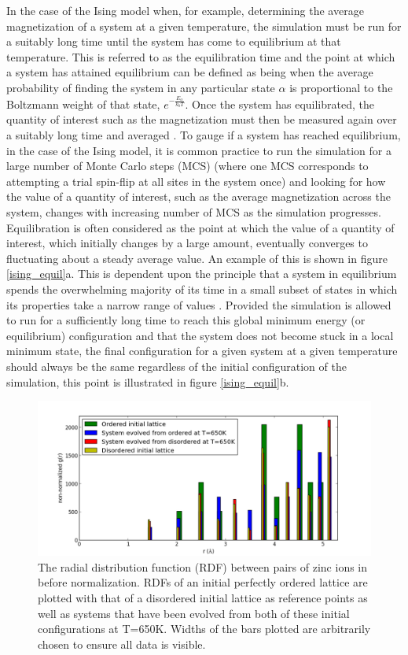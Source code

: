In the case of the Ising model when, for example, determining the average magnetization of a system at a given temperature, the simulation must be run for a suitably long time until the system has come to equilibrium at that temperature. This is referred to as the equilibration time and the point at which a system has attained equilibrium can be defined as being when the average probability of finding the system in any particular state $\alpha$ is proportional to the Boltzmann weight of that state, $e^{-\frac{E_\alpha}{k_bT}}$. Once the system has equilibrated, the quantity of interest such as the magnetization must then be measured again over a suitably long time and averaged \cite{MC}. 
To gauge if a system has reached equilibrium, in the case of the Ising model, it is common practice to run the simulation for a large number of Monte Carlo steps (MCS) (where one MCS corresponds to attempting a trial spin-flip at all sites in the system once) and looking for how the value of a quantity of interest, such as the average magnetization across the system, changes with increasing number of MCS as the simulation progresses. Equilibration is often considered as the point at which the value of a quantity of interest, which initially changes by a large amount, eventually converges to fluctuating about a steady average value. An example of this is shown in figure \ref{ising_equil}a. This is dependent upon the principle that a system in equilibrium spends the overwhelming majority of its time in a small subset of states in which its properties take a narrow range of values \cite{MC}. Provided the simulation is allowed to run for a sufficiently long time to reach this global minimum energy (or equilibrium) configuration and that the system does not become stuck in a local minimum state, the final configuration for a given system at a given temperature should always be the same regardless of the initial configuration of the simulation, this point is illustrated in figure \ref{ising_equil}b.

\begin{figure}[h!]
  \centering
    \includegraphics[width=1.0\textwidth]{figures/RDF_Z-Z_equil_check.png}
    \caption{The radial distribution function (RDF) between pairs of zinc ions in {\CZTS} before normalization. RDFs of an initial perfectly ordered lattice are plotted with that of a disordered initial lattice as reference points as well as systems that have been evolved from both of these initial configurations at T=650K. Widths of the bars plotted are arbitrarily chosen to ensure all data is visible.}
  \label{RDF_Z-Z_equil_check}
\end{figure}

